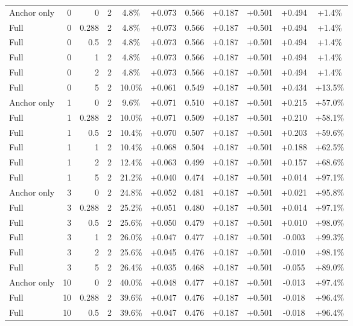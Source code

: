 \begin{table}[htbp]
\begin{tabular}{lrrrccccccc}
Anchor only & 0 & 0 & 2 & 4.8\% & +0.073 & 0.566 & +0.187 & +0.501 & +0.494 & +1.4\% \\
Full & 0 & 0.288 & 2 & 4.8\% & +0.073 & 0.566 & +0.187 & +0.501 & +0.494 & +1.4\% \\
Full & 0 & 0.5 & 2 & 4.8\% & +0.073 & 0.566 & +0.187 & +0.501 & +0.494 & +1.4\% \\
Full & 0 & 1 & 2 & 4.8\% & +0.073 & 0.566 & +0.187 & +0.501 & +0.494 & +1.4\% \\
Full & 0 & 2 & 2 & 4.8\% & +0.073 & 0.566 & +0.187 & +0.501 & +0.494 & +1.4\% \\
Full & 0 & 5 & 2 & 10.0\% & +0.061 & 0.549 & +0.187 & +0.501 & +0.434 & +13.5\% \\
Anchor only & 1 & 0 & 2 & 9.6\% & +0.071 & 0.510 & +0.187 & +0.501 & +0.215 & +57.0\% \\
Full & 1 & 0.288 & 2 & 10.0\% & +0.071 & 0.509 & +0.187 & +0.501 & +0.210 & +58.1\% \\
Full & 1 & 0.5 & 2 & 10.4\% & +0.070 & 0.507 & +0.187 & +0.501 & +0.203 & +59.6\% \\
Full & 1 & 1 & 2 & 10.4\% & +0.068 & 0.504 & +0.187 & +0.501 & +0.188 & +62.5\% \\
Full & 1 & 2 & 2 & 12.4\% & +0.063 & 0.499 & +0.187 & +0.501 & +0.157 & +68.6\% \\
Full & 1 & 5 & 2 & 21.2\% & +0.040 & 0.474 & +0.187 & +0.501 & +0.014 & +97.1\% \\
Anchor only & 3 & 0 & 2 & 24.8\% & +0.052 & 0.481 & +0.187 & +0.501 & +0.021 & +95.8\% \\
Full & 3 & 0.288 & 2 & 25.2\% & +0.051 & 0.480 & +0.187 & +0.501 & +0.014 & +97.1\% \\
Full & 3 & 0.5 & 2 & 25.6\% & +0.050 & 0.479 & +0.187 & +0.501 & +0.010 & +98.0\% \\
Full & 3 & 1 & 2 & 26.0\% & +0.047 & 0.477 & +0.187 & +0.501 & -0.003 & +99.3\% \\
Full & 3 & 2 & 2 & 25.6\% & +0.045 & 0.476 & +0.187 & +0.501 & -0.010 & +98.1\% \\
Full & 3 & 5 & 2 & 26.4\% & +0.035 & 0.468 & +0.187 & +0.501 & -0.055 & +89.0\% \\
Anchor only & 10 & 0 & 2 & 40.0\% & +0.048 & 0.477 & +0.187 & +0.501 & -0.013 & +97.4\% \\
Full & 10 & 0.288 & 2 & 39.6\% & +0.047 & 0.476 & +0.187 & +0.501 & -0.018 & +96.4\% \\
Full & 10 & 0.5 & 2 & 39.6\% & +0.047 & 0.476 & +0.187 & +0.501 & -0.018 & +96.4\% \\

\end{tabular}
\end{table}
